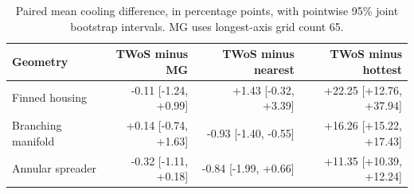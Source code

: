 \begin{table}[t]
\centering\small
\caption{Paired mean cooling difference, in percentage points, with pointwise
95\% joint bootstrap intervals. MG uses longest-axis grid count 65.}
\label{tab:pairedclaimscope}
\begin{tabular}{lrrr}
\toprule
Geometry & TWoS minus MG & TWoS minus nearest & TWoS minus hottest\\
\midrule
Finned housing & -0.11 [-1.24, +0.99] & +1.43 [-0.32, +3.39] & +22.25 [+12.76, +37.94] \\
Branching manifold & +0.14 [-0.74, +1.63] & -0.93 [-1.40, -0.55] & +16.26 [+15.22, +17.43] \\
Annular spreader & -0.32 [-1.11, +0.18] & -0.84 [-1.99, +0.66] & +11.35 [+10.39, +12.24] \\
\bottomrule
\end{tabular}
\end{table}
